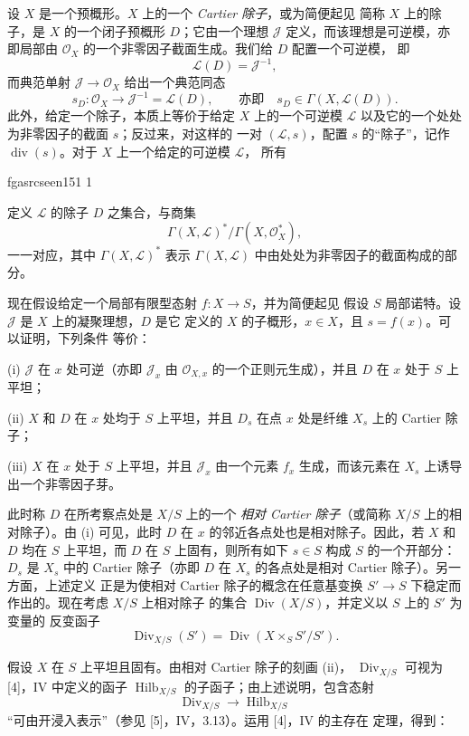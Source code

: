 \documentclass[12pt,twoside,openany]{book}
\numberwithin{equation}{section}
\newcommand{\fgaunitid}{unbound}
\newcommand{\src}[1]{%
  \phantomsection
  \hypertarget{src:\fgaunitid:#1}{}%
  \hypertarget{fga.\fgaunitid.p#1}{}%
  \ifcsname fgasrcseen#1\endcsname\else
    \expandafter\gdef\csname fgasrcseen#1\endcsname{1}%
    \hypertarget{src:#1}{}%
  \fi
  \marginpar{\raggedleft\footnotesize\sffamily #1}%
}
\theoremstyle{plain}
\theoremstyle{definition}
\theoremstyle{remark}
\begin{document}
设 $X$ 是一个预概形。$X$ 上的一个 \emph{Cartier 除子}，或为简便起见
简称 $X$ 上的除子，是 $X$ 的一个闭子预概形 $D$；它由一个理想
$\mathcal J$ 定义，而该理想是可逆模，亦即局部由
$\mathcal O_X$ 的一个非零因子截面生成。我们给 $D$ 配置一个可逆模，
即
\[
\mathcal L(D)=\mathcal J^{-1},
\]
而典范单射 $\mathcal J\longrightarrow\mathcal O_X$ 给出一个典范同态
\[
s_D:\mathcal O_X\longrightarrow\mathcal J^{-1}=\mathcal L(D),
\qquad\text{亦即}\quad s_D\in\Gamma(X,\mathcal L(D)).
\]
此外，给定一个除子，本质上等价于给定 $X$ 上的一个可逆模
$\mathcal L$ 以及它的一个处处为非零因子的截面 $s$；反过来，对这样的
一对 $(\mathcal L,s)$，配置 $s$ 的“除子”，记作
$\operatorname{div}(s)$。对于 $X$ 上一个给定的可逆模 $\mathcal L$，
所有

\src{151}
定义 $\mathcal L$ 的除子 $D$ 之集合，与商集
\[
\Gamma(X,\mathcal L)^*/\Gamma(X,\mathcal O_X^*),
\]
一一对应，其中 $\Gamma(X,\mathcal L)^*$ 表示
$\Gamma(X,\mathcal L)$ 中由处处为非零因子的截面构成的部分。

现在假设给定一个局部有限型态射 $f:X\longrightarrow S$，并为简便起见
假设 $S$ 局部诺特。设 $\mathcal J$ 是 $X$ 上的凝聚理想，$D$ 是它
定义的 $X$ 的子概形，$x\in X$，且 $s=f(x)$。可以证明，下列条件
等价：

\noindent (i) $\mathcal J$ 在 $x$ 处可逆（亦即 $\mathcal J_x$ 由
$\mathcal O_{X,x}$ 的一个正则元生成），并且 $D$ 在 $x$ 处于 $S$
上平坦；

\noindent (ii) $X$ 和 $D$ 在 $x$ 处均于 $S$ 上平坦，并且 $D_s$ 在点
$x$ 处是纤维 $X_s$ 上的 Cartier 除子；

\noindent (iii) $X$ 在 $x$ 处于 $S$ 上平坦，并且 $\mathcal J_x$
由一个元素 $f_x$ 生成，而该元素在 $X_s$ 上诱导出一个非零因子芽。

此时称 $D$ 在所考察点处是 $X/S$ 上的一个
\emph{相对 Cartier 除子}（或简称 $X/S$ 上的相对除子）。由 (i)
可见，此时 $D$ 在 $x$ 的邻近各点处也是相对除子。因此，若 $X$ 和
$D$ 均在 $S$ 上平坦，而 $D$ 在 $S$ 上固有，则所有如下 $s\in S$
构成 $S$ 的一个开部分：$D_s$ 是 $X_s$ 中的 Cartier 除子（亦即
$D$ 在 $X_s$ 的各点处是相对 Cartier 除子）。另一方面，上述定义
正是为使相对 Cartier 除子的概念在任意基变换
$S'\longrightarrow S$ 下稳定而作出的。现在考虑 $X/S$ 上相对除子
的集合 $\operatorname{Div}(X/S)$，并定义以 $S$ 上的 $S'$ 为变量的
反变函子
\[
\operatorname{Div}_{X/S}(S')=
\operatorname{Div}(X\times_SS'/S').
\]

假设 $X$ 在 $S$ 上平坦且固有。由相对 Cartier 除子的刻画 (ii)，
$\operatorname{Div}_{X/S}$ 可视为 [4]，IV 中定义的函子
$\operatorname{Hilb}_{X/S}$ 的子函子；由上述说明，包含态射
\[
\operatorname{Div}_{X/S}\longrightarrow\operatorname{Hilb}_{X/S}
\]
“可由开浸入表示”（参见 [5]，IV，3.13）。运用 [4]，IV 的主存在
定理，得到：
\end{document}
